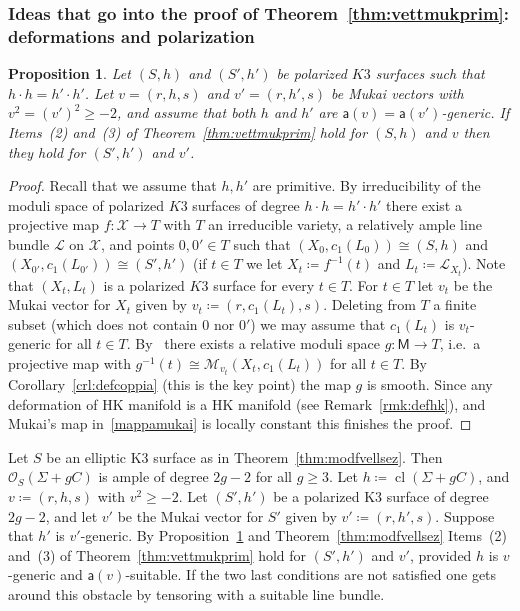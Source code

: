 \documentclass[11pt]{amsart}
\let\mathcal\mathscr
\def\cL{\mathcal{L}}
\def\cM{\mathcal{M}}
\def\cO{\mathcal{O}}
\def\cX{\mathcal{X}}
\DeclareMathOperator{\cl}{cl}
\newtheorem{prp}[lmm]{Proposition}
\theoremstyle{definition}
\theoremstyle{remark}
\begin{document}
\subsubsection{Ideas that go into the proof of Theorem~\ref{thm:vettmukprim}: deformations and polarization}\label{subsubsec:disegnodimdue}
%
%
\begin{prp}\label{prp:spalmo}
%
Let $(S,h)$ and $(S',h')$ be polarized $K3$ surfaces such that $h\cdot h=h'\cdot h'$.  Let $v=(r,h,s)$ and $v'=(r,h',s)$ be Mukai vectors with $v^2=(v')^2\ge -2$, and assume that both $h$ and $h'$ are ${\mathsf a}(v)={\mathsf a}(v')$-generic. If 
Items~(2) and~(3) of Theorem~\ref{thm:vettmukprim} hold for $(S,h)$ and $v$ then they hold  for $(S',h')$ and $v'$.
%
\end{prp}
%
%
\begin{proof}
%
Recall that we assume that $h,h'$ are primitive. By irreducibility of the moduli space of polarized $K3$ surfaces of degree 
$h\cdot h=h'\cdot h'$ there exist a projective map $f\colon \cX\to T$ with $T$ an irreducible variety,  a relatively ample line bundle $\cL$ on $\cX$, and points $0,0'\in T$ such that $(X_0, c_1(L_0))\cong (S,h)$ and $(X_{0'}, c_1(L_{0'}))\cong (S',h')$ (if $t\in T$ we let $X_t\coloneqq f^{-1}(t)$ and
$L_t\coloneqq\cL_{X_t}$). Note that $(X_t, L_t)$ is a polarized $K3$ surface for every $t\in T$. For $t\in T$ let $v_t$ be the Mukai vector for $X_t$  
given by $v_t\coloneqq(r,c_1(L_t),s)$. Deleting from $T$ a finite subset (which does not contain $0$ nor $0'$) we may assume that 
$c_1(L_t)$ is $v_t$-generic for all $t\in T$. 
By~\cite{maruyama:modfasci} there exists a relative moduli space $g\colon{\mathsf M}\to T$, i.e.~a projective map with $g^{-1}(t)\cong\cM_{v_t}(X_t,c_1(L_t))$  for all $t\in T$. By Corollary~\ref{crl:defcoppia} (this is the key point) the map $g$ is smooth. Since any deformation of HK manifold is a HK manifold (see Remark~\ref{rmk:defhk}), and Mukai's map in~\eqref{mappamukai} is locally constant  this finishes the proof. 
%
\end{proof}
%
Let $S$ be an elliptic K3 surface as in Theorem~\ref{thm:modfvellsez}. Then $\cO_S(\Sigma+gC)$ is ample of degree $2g-2$ for all $g\ge 3$. 
Let $h\coloneqq \cl(\Sigma+gC)$, and $v\coloneqq (r,h,s)$ with $v^2\ge -2$. Let $(S',h')$ be a polarized K3 surface of degree $2g-2$, 
 and let $v'$ be the Mukai vector for $S'$ given by $v'\coloneqq (r,h',s)$. Suppose that $h'$ is $v'$-generic. 
By Proposition~\ref{prp:spalmo} and Theorem~\ref{thm:modfvellsez} Items~(2) and~(3) of Theorem~\ref{thm:vettmukprim} hold for $(S',h')$ and $v'$, provided $h$ is $v$-generic and ${\mathsf a}(v)$-suitable. If the two last  conditions are not satisfied  one gets around this obstacle  by tensoring with a suitable line bundle.
\end{document}
